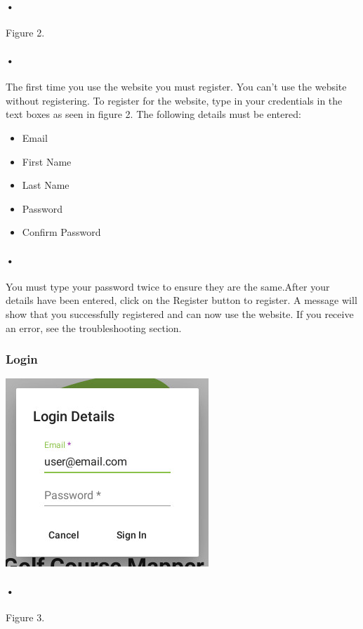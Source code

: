 \documentclass{article}
\begin{document}
	\paragraph{•}
    Figure 2.
	\paragraph{•}
	The first time you use the website you must register. You can't use the website without registering. To register for the website, type in your credentials in the text boxes as seen in figure 2. The following details must be entered:
	
	\begin{itemize}
		\item Email
		\item First Name
		\item Last Name
		\item Password
		\item Confirm Password
	\end{itemize}
	
	
	\paragraph{•}
	You must type your password twice to ensure they are the same.After your details have been 	entered, click on the Register button to register. A message will show that you successfully registered and can now use the website. If you receive an error, see the troubleshooting section.
	
		
	
	
	\subsubsection{Login}
	\includegraphics[scale=1.5]{2_login}
	\paragraph{•}
    Figure 3.
\end{document}
